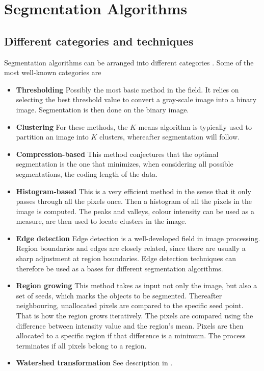 \documentclass[a4paper,10pt]{article}
\begin{document}
\newpage
\section{Segmentation Algorithms}
\subsection{Different categories and techniques}
Segmentation algorithms can be arranged into different categories \cite{is}. 
Some of the most well-known categories are
\begin{itemize}
 \item \textbf{Thresholding}  Possibly the most basic method in the
field.  It relies on selecting the best threshold value to convert a gray-scale
image into a binary image.  Segmentation is then done on the binary image. 
 \item \textbf{Clustering} For these methods, the $K$-means algorithm
is typically used to partition an image into $K$ clusters, whereafter
segmentation will follow.
 \item \textbf{Compression-based} This method conjectures that the
optimal segmentation is the one that minimizes, when considering all possible
segmentations, the coding length of the data.
 \item \textbf{Histogram-based}  This is a very efficient method in the
sense that it only passes through all the pixels once.  Then a histogram of all
the pixels in the image is computed.  The peaks and valleys, colour intensity
can be used as a measure, are then used to locate clusters in the image.
 \item \textbf{Edge detection} Edge detection is a well-developed
field in image processing.  Region boundaries and edges are closely related,
since there are usually a sharp adjustment at region boundaries.  Edge detection
techniques can therefore be used as a bases for different segmentation
algorithms.  
 \item \textbf{Region growing} This method takes as input not only
the image, but also a set of seeds, which marks the objects to be segmented. 
Thereafter neighbouring, unallocated pixels are compared to the specific seed
point.  That is how the region grows iteratively.  The pixels are compared using
the difference between intensity value and the region's mean.  Pixels are then
allocated to a specific region if that difference is a minimum.  The process
terminates if all pixels belong to a region.  
 \item \textbf{Watershed transformation} See description in .    

\end{itemize}
\end{document}
